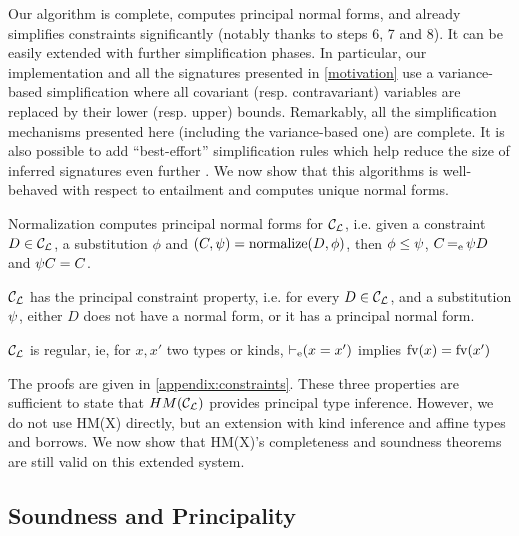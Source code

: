 
Our algorithm is complete, computes principal normal forms,
and already simplifies constraints significantly
(notably thanks to steps 6, 7 and 8).
It can be easily extended with further simplification phases.
In particular, our implementation and all the signatures presented in
\cref{motivation} use a variance-based simplification
where all covariant (resp. contravariant) variables are replaced by their
lower (resp. upper) bounds.
Remarkably, all the simplification mechanisms presented
here (including the variance-based one) are complete.
It is also possible to add ``best-effort'' simplification
rules which help reduce the size of inferred signatures even further
\citep{DBLP:conf/aplas/Simonet03}.
%
We now show that this algorithms is well-behaved with respect to entailment
and computes unique normal forms.

\begin{property}
  Normalization computes principal normal forms for ${\mathcal C_{\mathcal L}}$, i.e. 
  given a constraint $D\in{\mathcal C_{\mathcal L}}$, a substitution $\phi$ and
  $(C,\mathrm{\psi}) = \operatorname{normalize}(D,\phi)$,
  then $\phi\leq\mathrm{\psi}$,
  $C \operatorname{=_e} \mathrm{\psi} D$ and
  $\mathrm{\psi} C = C$.
\end{property}

\begin{property}
  ${\mathcal C_{\mathcal L}}$ has the principal constraint property, i.e.
  for every $D\in{\mathcal C_{\mathcal L}}$, and a substitution $\mathrm{\psi}$,
  either $D$ does not have a normal form, or it has
  a principal normal form.
\end{property}

\begin{property}
  ${\mathcal C_{\mathcal L}}$ is regular, ie, for $x, x'$ two types or kinds,
  $\operatorname{\vdash_e} (x = x')$ implies
  $\operatorname{fv}(x) = \operatorname{fv}(x')$
\end{property}

The proofs are given in \cref{appendix:constraints}. These three properties
are sufficient to state that $HM({\mathcal C_{\mathcal L}})$ provides principal type inference.
However, we do not use HM(X) directly, but an extension with kind inference
and affine types and borrows.
We now show that HM(X)'s completeness and soundness theorems are still valid on
this extended system.

\subsection{Soundness and Principality}


